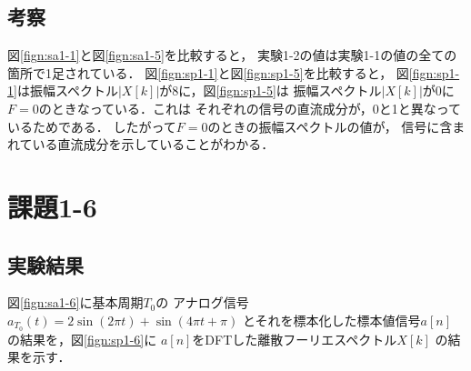 \documentclass[11pt, a4paper, titlepage]{ltjsarticle}
\begin{document}
\subsection*{考察}
図\ref*{fign:sa1-1}と図\ref*{fign:sa1-5}を比較すると，
実験1-2の値は実験1-1の値の全ての箇所で1足されている．
図\ref*{fign:sp1-1}と図\ref*{fign:sp1-5}を比較すると，
図\ref*{fign:sp1-1}は振幅スペクトル$|X[k]|$が8に，図\ref*{fign:sp1-5}は
振幅スペクトル$|X[k]|$が0に$F=0$のときなっている．これは
それぞれの信号の直流成分が，0と1と異なっているためである．
したがって$F=0$のときの振幅スペクトルの値が，
信号に含まれている直流成分を示していることがわかる．


\newpage
\section*{課題1-6}
\subsection*{実験結果}
図\ref*{fign:sa1-6}に基本周期$T_{0}$の
アナログ信号$a_{T_{0}}(t)=2\sin(2\pi t)+\sin(4\pi t+\pi)$
とそれを標本化した標本値信号$a[n]$
の結果を，図\ref*{fign:sp1-6}に
$a[n]$をDFTした離散フーリエスペクトル$X[k]$
の結果を示す．
\end{document}

